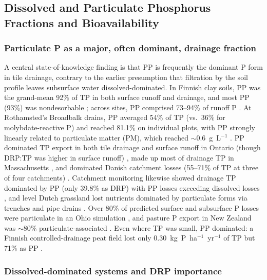 \documentclass[11pt]{article}
\begin{document}
\subsection{Dissolved and Particulate Phosphorus Fractions and Bioavailability}

\subsubsection{Particulate P as a major, often dominant, drainage fraction}

A central state-of-knowledge finding is that PP is frequently the dominant P form in
tile drainage, contrary to the earlier presumption that filtration by the soil
profile leaves subsurface water dissolved-dominated. In Finnish clay soils, PP was
the grand-mean 92\% of TP in both surface runoff and drainage, and most PP (93\%)
was nondesorbable \parencite{Uusitalo2001}; across sites, PP comprised 73--94\% of
runoff P \parencite{Uusitalo2003}. At Rothamsted's Broadbalk drains, PP averaged 54\%
of TP (vs.\ 36\% for molybdate-reactive P) and reached 81.1\% on individual plots,
with PP strongly linearly related to particulate matter (PM), which reached
$\sim$0.6~g~L$^{-1}$ \parencite{Lu2003,Lu2004}. PP dominated TP export in both tile
drainage and surface runoff in Ontario (though DRP:TP was higher in surface runoff)
\parencite{VanEsbroeck2016}, made up most of drainage TP in Massachusetts
\parencite{Millar2025}, and dominated Danish catchment losses (55--71\% of TP at
three of four catchments) \parencite{Grant1996}. Catchment monitoring likewise showed
drainage TP dominated by PP (only 39.8\% as DRP) with PP losses exceeding dissolved
losses \parencite{Brendel2019}, and level Dutch grassland lost nutrients dominated by
particulate forms via trenches and pipe drains \parencite{vanderSalm2012}. Over 80\%
of predicted surface and subsurface P losses were particulate in an Ohio simulation
\parencite{Askar2021b}, and pasture P export in New Zealand was $\sim$80\%
particulate-associated \parencite{Gillingham2000}. Even where TP was small, PP
dominated: a Finnish controlled-drainage peat field lost only
0.30~kg~P~ha$^{-1}$~yr$^{-1}$ of TP but 71\% as PP \parencite{Pham2023}.

\subsubsection{Dissolved-dominated systems and DRP importance}
\end{document}
